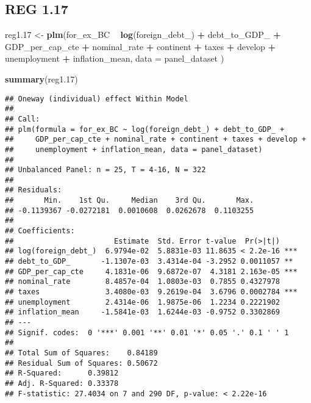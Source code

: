 \documentclass[]{article}
\newenvironment{Shaded}{\begin{snugshade}}{\end{snugshade}}
\newcommand{\KeywordTok}[1]{\textcolor[rgb]{0.13,0.29,0.53}{\textbf{#1}}}
\newcommand{\DataTypeTok}[1]{\textcolor[rgb]{0.13,0.29,0.53}{#1}}
\newcommand{\DecValTok}[1]{\textcolor[rgb]{0.00,0.00,0.81}{#1}}
\newcommand{\StringTok}[1]{\textcolor[rgb]{0.31,0.60,0.02}{#1}}
\newcommand{\OperatorTok}[1]{\textcolor[rgb]{0.81,0.36,0.00}{\textbf{#1}}}
\newcommand{\NormalTok}[1]{#1}
\begin{document}
\subsection{REG 1.17}\label{reg-1.17}

\begin{Shaded}
\begin{Highlighting}[]
\NormalTok{reg1.}\DecValTok{17}\NormalTok{ <-}\StringTok{ }\KeywordTok{plm}\NormalTok{(for_ex_BC }\OperatorTok{~}\StringTok{ }\KeywordTok{log}\NormalTok{(foreign_debt_) }\OperatorTok{+}\StringTok{ }\NormalTok{debt_to_GDP_ }\OperatorTok{+}\StringTok{ }\NormalTok{GDP_per_cap_cte }\OperatorTok{+}\StringTok{ }\NormalTok{nominal_rate }\OperatorTok{+}\StringTok{ }\NormalTok{continent }\OperatorTok{+}\StringTok{ }\NormalTok{taxes }\OperatorTok{+}\StringTok{ }\NormalTok{develop }\OperatorTok{+}\StringTok{ }\NormalTok{unemployment }\OperatorTok{+}\StringTok{ }\NormalTok{inflation_mean, }\DataTypeTok{data =}\NormalTok{ panel_dataset )}

\KeywordTok{summary}\NormalTok{(reg1.}\DecValTok{17}\NormalTok{)}
\end{Highlighting}
\end{Shaded}

\begin{verbatim}
## Oneway (individual) effect Within Model
## 
## Call:
## plm(formula = for_ex_BC ~ log(foreign_debt_) + debt_to_GDP_ + 
##     GDP_per_cap_cte + nominal_rate + continent + taxes + develop + 
##     unemployment + inflation_mean, data = panel_dataset)
## 
## Unbalanced Panel: n = 25, T = 4-16, N = 322
## 
## Residuals:
##       Min.    1st Qu.     Median    3rd Qu.       Max. 
## -0.1139367 -0.0272181  0.0010608  0.0262678  0.1103255 
## 
## Coefficients:
##                       Estimate  Std. Error t-value  Pr(>|t|)    
## log(foreign_debt_)  6.9794e-02  5.8831e-03 11.8635 < 2.2e-16 ***
## debt_to_GDP_       -1.1307e-03  3.4314e-04 -3.2952 0.0011057 ** 
## GDP_per_cap_cte     4.1831e-06  9.6872e-07  4.3181 2.163e-05 ***
## nominal_rate        8.4857e-04  1.0803e-03  0.7855 0.4327978    
## taxes               3.4080e-03  9.2619e-04  3.6796 0.0002784 ***
## unemployment        2.4314e-06  1.9875e-06  1.2234 0.2221902    
## inflation_mean     -1.5841e-03  1.6244e-03 -0.9752 0.3302869    
## ---
## Signif. codes:  0 '***' 0.001 '**' 0.01 '*' 0.05 '.' 0.1 ' ' 1
## 
## Total Sum of Squares:    0.84189
## Residual Sum of Squares: 0.50672
## R-Squared:      0.39812
## Adj. R-Squared: 0.33378
## F-statistic: 27.4034 on 7 and 290 DF, p-value: < 2.22e-16
\end{verbatim}
\end{document}
